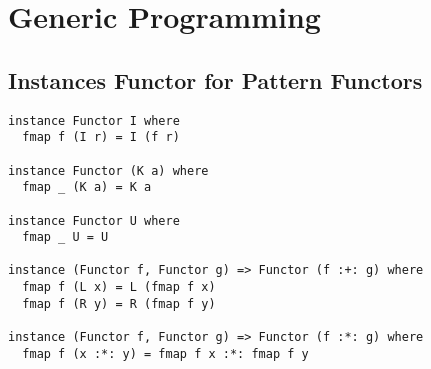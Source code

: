\appendix
\chapter{Generic Programming}
\section{Instances Functor for Pattern Functors}
\label{app-inst-functor-patfun}
\begin{verbatim}
instance Functor I where
  fmap f (I r) = I (f r)

instance Functor (K a) where
  fmap _ (K a) = K a

instance Functor U where
  fmap _ U = U

instance (Functor f, Functor g) => Functor (f :+: g) where
  fmap f (L x) = L (fmap f x)
  fmap f (R y) = R (fmap f y)

instance (Functor f, Functor g) => Functor (f :*: g) where
  fmap f (x :*: y) = fmap f x :*: fmap f y
\end{verbatim}
